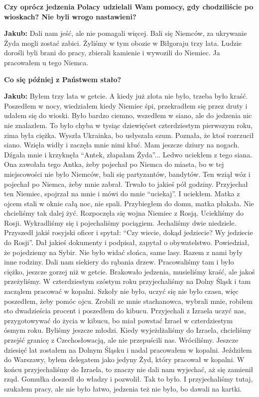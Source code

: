 \textbf{Czy oprócz jedzenia Polacy udzielali Wam pomocy, gdy chodziliście po wioskach? Nie byli wrogo nastawieni?} 

\textbf{Jakub:} Dali nam jeść, ale nie pomagali więcej. Bali się Niemców, za ukrywanie Żyda mogli zostać zabici. Żyliśmy w tym obozie w Biłgoraju trzy lata. Ludzie dorośli byli brani do pracy, zbierali kamienie i wywozili do Niemiec. Ja pracowałem u tego Niemca.

\textbf{Co się później z Państwem stało?} 

\textbf{Jakub:} Byłem trzy lata w getcie. A kiedy już złota nie było, trzeba było kraść. Poszedłem w nocy, wiedziałem kiedy Niemiec śpi, przekradłem się przez druty i udałem się do wioski. Było bardzo ciemno, wszedłem w siano, ale do jedzenia nic nie znalazłem. To było chyba w tysiąc dziewięćset czterdziestym pierwszym roku, zima była ciężka. Wyszła Ukrainka, bo usłyszała szum. Poznała, że ktoś rozrzucił siano. Wzięła widły i zaczęła mnie nimi kłuć. Mam jeszcze dziury na nogach. Dźgała mnie i krzyknęła "`Antek, złapałam Żyda"'... Ledwo uciekłem z tego siana. Ona zawołała tego Antka, żeby pojechał po Niemca do miasta, bo w tej miejscowości nie było Niemców, bali się partyzantów, bandytów. Ten wziął wóz i pojechał po Niemca, żeby mnie zabrał. Trwało to jakieś pół godziny. Przyjechał ten Niemiec, spojrzał na mnie i mówi do mnie "`uciekaj"'. I uciekłem. Matka z ojcem stali w oknie całą noc, nie spali. Przybiegłem do domu, matka płakała. Nie chcieliśmy tak dalej żyć. Rozpoczęła się wojna Niemiec z Rosją. Uciekliśmy do Rosji. Wykradliśmy się i pojechaliśmy pociągiem. Jechaliśmy dwie niedziele. Przyszedł jakiś rosyjski oficer i spytał: "`Czy wiecie, dokąd jedziecie? Wy jedziecie do Rosji"'. Dał jakieś dokumenty i podpisał, zapytał o obywatelstwo. Powiedział, że pojedziemy na Sybir. Nie było widać słońca, same lasy. Razem z nami były inne rodziny. Dali nam siekiery do rąbania drzew. Pracowaliśmy tam i było ciężko, jeszcze gorzej niż w getcie. Brakowało jedzenia, musieliśmy kraść, ale jakoś przeżyliśmy. W czterdziestym szóstym roku przyjechaliśmy na Dolny Śląsk i tam zacząłem pracować w kopalni. Szkoły nie było, uczyć się nie było czasu, więc poszedłem, żeby pomóc ojcu. Zrobili ze mnie stachanowca, wybrali mnie, robiłem sto dwadzieścia procent i poszedłem do kibucu. Przyjechali z Izraela uczyć nas, przygotowywać do życia w kibucu, bo miał powstać Izrael w czterdziestym ósmym roku. Byliśmy jeszcze młodzi. Kiedy wyjeżdżaliśmy do Izraela, chcieliśmy przejść granicę z Czechosłowacją, ale nie przepuścili nas. Wróciliśmy. Jeszcze dziesięć lat zostałem na Dolnym Śląsku i nadal pracowałem w kopalni. Jeździłem do Warszawy, byłem delegatem jako jedyny Żyd, który pracował w kopalni. W końcu przyjechaliśmy do Izraela, to znaczy nie dali nam wyjechać, aż się zamienił rząd. Gomułka doszedł do władzy i pozwolił. Tak to było. I przyjechaliśmy tutaj, szukałem pracy, ale nie było łatwo, jedzenia też nie było, bo dawali na kartki.

